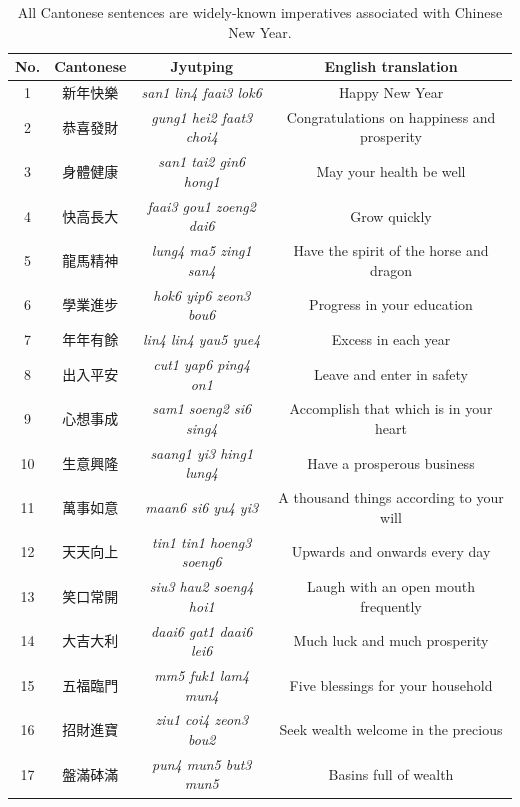 \begin{table}[!htbp]
\begin{center}
  \tiny
\begin{tabular}{cccc} %
\toprule
\textbf{No.} & \textbf{Cantonese} & \textbf{Jyutping} & \textbf{English translation} \\ 
\midrule
1 & 新年快樂 & \textit{san1 lin4 faai3 lok6} & Happy New Year \\ 
2 & 恭喜發財 & \textit{gung1 hei2 faat3 choi4} & Congratulations on happiness and prosperity \\ 
3 & 身體健康 & \textit{san1 tai2 gin6 hong1} & May your health be well \\ 
4 & 快高長大 & \textit{faai3 gou1 zoeng2 dai6} & Grow quickly \\ 
5 & 龍馬精神 & \textit{lung4 ma5 zing1 san4} & Have the spirit of the horse and dragon \\ 
6 & 學業進步 &\textit{ hok6 yip6 zeon3 bou6} & Progress in your education \\ 
7 & 年年有餘 & \textit{lin4 lin4 yau5 yue4} & Excess in each year \\ 
8 & 出入平安 & \textit{cut1 yap6 ping4 on1} & Leave and enter in safety \\ 
9 & 心想事成 & \textit{sam1 soeng2 si6 sing4} & Accomplish that which is in your heart \\ 
10 & 生意興隆 & \textit{saang1 yi3 hing1 lung4} & Have a prosperous business \\ 
11 & 萬事如意 & \textit{maan6 si6 yu4 yi3} & A thousand things according to your will \\ 
12 & 天天向上 & \textit{tin1 tin1 hoeng3 soeng6} & Upwards and onwards every day \\ 
13 & 笑口常開 & \textit{siu3 hau2 soeng4 hoi1} & Laugh with an open mouth frequently \\ 
14 & 大吉大利 & \textit{daai6 gat1 daai6 lei6} & Much luck and much prosperity \\ 
15 & 五福臨門 & \textit{mm5 fuk1 lam4 mun4} & Five blessings for your household \\ 
16 & 招財進寶 & \textit{ziu1 coi4 zeon3 bou2} & Seek wealth welcome in the precious \\ 
17 & 盤滿砵滿 & \textit{pun4 mun5 but3 mun5} & Basins full of wealth \\ 
\bottomrule
\end{tabular}
\caption{All Cantonese sentences are widely-known imperatives associated with Chinese New Year.}
\label{ch2:tab:can_sent}
\end{center}
\end{table}


